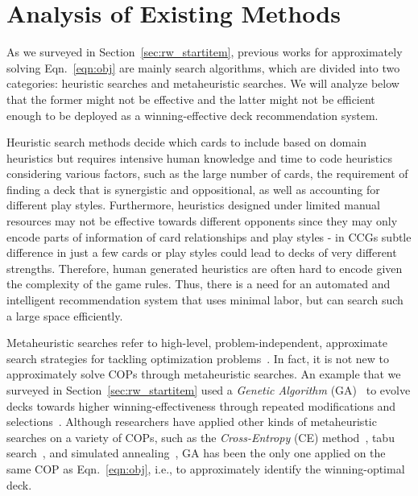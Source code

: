 \section{Analysis of Existing Methods}\label{sec:qdeckrec_existmethodanaly}
As we surveyed in Section~\ref{sec:rw_startitem}, previous works for approximately solving Eqn.~\ref{eqn:obj} are mainly search algorithms, which are divided into two categories: heuristic searches and metaheuristic searches. We will analyze below that the former might not be effective and the latter might not be efficient enough to be deployed as a winning-effective deck recommendation system.

Heuristic search methods decide which cards to include based on domain heuristics but requires intensive human knowledge and time to code heuristics considering various factors, such as the large number of cards, the requirement of finding a deck that is synergistic and oppositional, as well as accounting for different play styles. Furthermore, heuristics designed under limited manual resources may not be effective towards different opponents since they may only encode parts of information of card relationships and play styles - in CCGs subtle difference in just a few cards or play styles could lead to decks of very different strengths. Therefore, human generated heuristics are often hard to encode given the complexity of the game rules. Thus, there is a need for an automated and intelligent recommendation system that uses minimal labor, but can search such a large space efficiently. 

Metaheuristic searches refer to high-level, problem-independent, approximate search strategies for tackling optimization problems~\citep{birattari2009tuning}. In fact, it is not new to approximately solve COPs through metaheuristic searches. An example that we surveyed in Section~\ref{sec:rw_startitem} used a \textit{Genetic Algorithm} (GA)~\citep{holland1992adaptation} to evolve decks towards higher winning-effectiveness through repeated modifications and selections~\citep{garcia2016evolutionary,bjorke2017deckbuilding}. Although researchers have applied other kinds of metaheuristic searches on a variety of COPs, such as the \textit{Cross-Entropy} (CE) method~\citep{rubinstein1999cross}, tabu search~\citep{glover1986future}, and simulated annealing~\citep{kirkpatrick1983optimization}, GA has been the only one applied on the same COP as Eqn.~\ref{eqn:obj}, i.e., to approximately identify the winning-optimal deck. 



